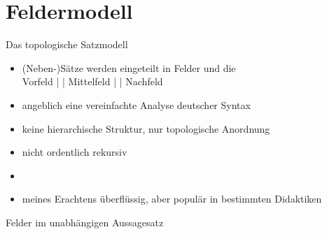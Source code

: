 \section{Feldermodell}

\begin{frame}
  {Das topologische Satzmodell}
  \onslide<+->
  \onslide<+->
  \begin{itemize}[<+->]
    \item (Neben-)Sätze werden eingeteilt in \alert{Felder} und die  \\
      \Halbzeile
      \alert{Vorfeld} |  | \alert{Mittelfeld} |  | \alert{Nachfeld}\\
      \Halbzeile
      \Zeile
    \item angeblich eine vereinfachte Analyse deutscher Syntax
    \item keine hierarchische Struktur, nur topologische Anordnung
    \item nicht ordentlich rekursiv
      \Zeile
    \item {}
    \item meines Erachtens überflüssig, aber populär in bestimmten Didaktiken
  \end{itemize}
\end{frame}

  
\begin{frame}
  {Felder im unabhängigen Aussagesatz}
  \centering 
\end{frame}

